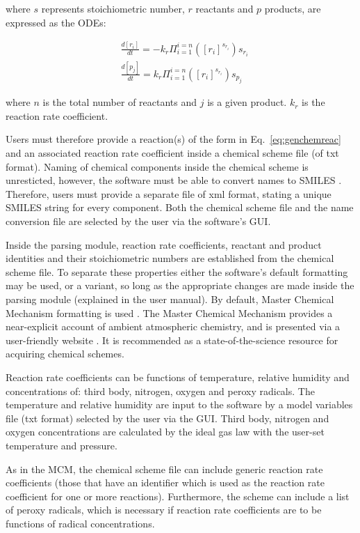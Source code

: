 \documentclass[gmd, manuscript]{copernicus}
\begin{document}
where $s$ represents stoichiometric number, $r$ reactants and $p$ products, are expressed as the ODEs:

\begin{align} \label{eq:genchemode}
	&\frac{d[r_{i}]}{dt} = -k_r\Pi_{i=1}^{i=n}\left([r_i]^{s_{r_{i}}}\right)s_{r_{i}}\\
	&\frac{d[p_{j}]}{dt} = k_r\Pi_{i=1}^{i=n}\left([r_i]^{s_{r_{i}}}\right)s_{p_{j}} 
\end{align}

where $n$ is the total number of reactants and $j$ is a given product.  $k_r$ is the reaction rate coefficient.

Users must therefore provide a reaction(s) of the form in Eq.~\ref{eq:genchemreac} and an associated reaction rate coefficient inside a chemical scheme file (of txt format).  Naming of chemical components inside the chemical scheme is unresticted, however, the software must be able to convert names to SMILES \citep{Weininger1988}.  Therefore, users must provide a separate file of xml format, stating a unique SMILES string for every component.  Both the chemical scheme file and the name conversion file are selected by the user via the software's GUI.

Inside the parsing module, reaction rate coefficients, reactant and product identities and their stoichiometric numbers are established from the chemical scheme file.  To separate these properties either the software's default formatting may be used, or a variant, so long as the appropriate changes are made inside the parsing module (explained in the user manual).  By default, Master Chemical Mechanism formatting is used \citep{Jenkin1997, Saunders2003}.  The Master Chemical Mechanism provides a near-explicit account of ambient atmospheric chemistry, and is presented via a user-friendly website \citep{MCM2020}.  It is recommended as a state-of-the-science resource for acquiring chemical schemes.

Reaction rate coefficients can be functions of temperature, relative humidity and concentrations of: third body, nitrogen, oxygen and peroxy radicals.  The temperature and relative humidity are input to the software by a model variables file (txt format) selected by the user via the GUI.  Third body, nitrogen and oxygen concentrations are calculated by the ideal gas law with the user-set temperature and pressure.

As in the MCM, the chemical scheme file can include generic reaction rate coefficients (those that have an identifier which is used as the reaction rate coefficient for one or more reactions).  Furthermore, the scheme can include a list of peroxy radicals, which is necessary if reaction rate coefficients are to be functions of radical concentrations.
\end{document}
